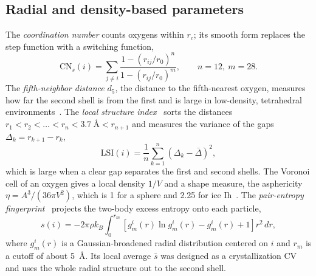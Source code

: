 \documentclass[11pt,a4paper]{article}
\begin{document}
\subsection{Radial and density-based parameters}
The \emph{coordination number} counts oxygens within $r_c$; its smooth form
replaces the step function with a switching function,
\begin{equation}
  \mathrm{CN}_s(i)=\sum_{j\ne i}\frac{1-(r_{ij}/r_0)^{n}}{1-(r_{ij}/r_0)^{m}},
  \qquad n=12,\ m=28 .
\end{equation}
The \emph{fifth-neighbor distance} $d_5$, the distance to the fifth-nearest
oxygen, measures how far the second shell is from the first and is large in
low-density, tetrahedral environments~\cite{SaikaVoivod2000,Cuthbertson2011}.
The \emph{local structure index}~\cite{Shiratani1996,Shiratani1998} sorts the
distances $r_1<r_2<\dots<r_n<3.7~\text{\AA}<r_{n+1}$ and measures the variance of the
gaps $\Delta_k=r_{k+1}-r_k$,
\begin{equation}
  \mathrm{LSI}(i)=\frac1n\sum_{k=1}^{n}\left(\Delta_k-\bar\Delta\right)^2 ,
\end{equation}
which is large when a clear gap separates the first and second shells. The
Voronoi cell of an oxygen gives a local density $1/V$ and a shape measure,
the asphericity $\eta=A^3/(36\pi V^2)$, which is 1 for a sphere and 2.25 for
ice Ih~\cite{Medvedev1989,Ruocco1992,Jedlovszky_1999}. The
\emph{pair-entropy fingerprint}~\cite{Piaggi2017,Piaggi2017b} projects the
two-body excess entropy onto each particle,
\begin{equation}
  s(i)=-2\pi\rho k_B\int_0^{r_m}\left[g_m^i(r)\ln g_m^i(r)-g_m^i(r)+1\right]r^2\,dr,
\end{equation}
where $g_m^i(r)$ is a Gaussian-broadened radial distribution centered on $i$
and $r_m$ is a cutoff of about 5~\AA. Its local average $\bar s$ was designed
as a crystallization CV and uses the whole radial structure out to the second
shell.
\end{document}
